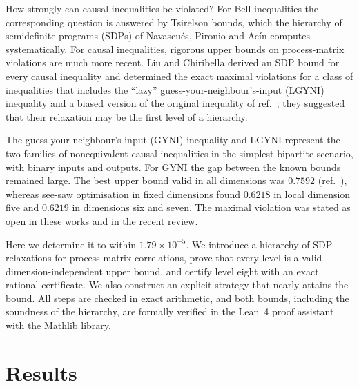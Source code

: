 \documentclass[11pt]{article}
\begin{document}
How strongly can causal inequalities be violated? For Bell inequalities the corresponding question is answered by Tsirelson bounds\cite{Tsirelson1980}, which the hierarchy of semidefinite programs (SDPs) of Navascu\'es, Pironio and Ac\'in computes systematically\cite{NPA2007,NPA2008,Brunner2014}. For causal inequalities, rigorous upper bounds on process-matrix violations are much more recent\cite{Brukner2015,LiuChiribella2025}. Liu and Chiribella derived an SDP bound for every causal inequality and determined the exact maximal violations for a class of inequalities that includes the ``lazy'' guess-your-neighbour's-input (LGYNI) inequality and a biased version of the original inequality of ref.~; they suggested that their relaxation may be the first level of a hierarchy\cite{LiuChiribella2025}.

The guess-your-neighbour's-input (GYNI) inequality and LGYNI represent the two families of nonequivalent causal inequalities in the simplest bipartite scenario, with binary inputs and outputs\cite{Branciard2016}. For GYNI the gap between the known bounds remained large. The best upper bound valid in all dimensions was $0.7592$ (ref.~), whereas see-saw optimisation in fixed dimensions found $0.6218$ in local dimension five\cite{Branciard2016} and $0.6219$ in dimensions six and seven\cite{BoghiuSimonov2026}. The maximal violation was stated as open in these works and in the recent review\cite{Branciard2016,LiuChiribella2025,BoghiuSimonov2026,Costa2026review}.

Here we determine it to within $1.79\times10^{-5}$. We introduce a hierarchy of SDP relaxations for process-matrix correlations, prove that every level is a valid dimension-independent upper bound, and certify level eight with an exact rational certificate. We also construct an explicit strategy that nearly attains the bound. All steps are checked in exact arithmetic, and both bounds, including the soundness of the hierarchy, are formally verified in the Lean~4 proof assistant\cite{Lean4} with the Mathlib library\cite{Mathlib2020}.

\section*{Results}
\end{document}
